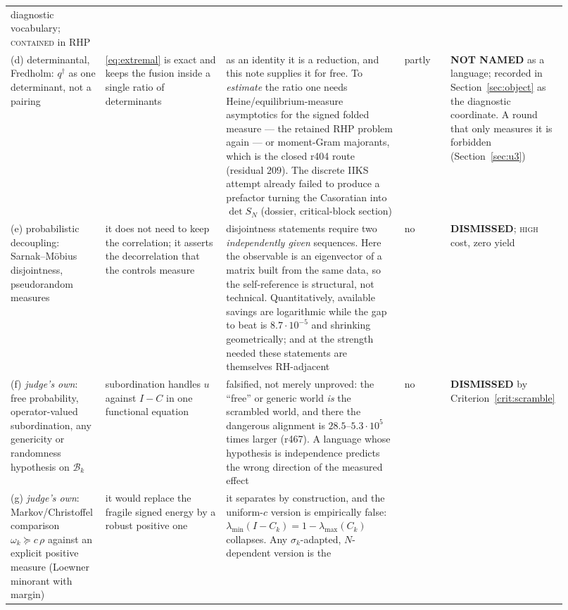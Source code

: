 \documentclass[11pt]{article}
\theoremstyle{remark}
\newcommand{\qdag}{q^{\dagger}}
\begin{document}
{\begin{longtable}{@{}p{0.155\linewidth}p{0.215\linewidth}p{0.315\linewidth}p{0.085\linewidth}p{0.145\linewidth}@{}}
{diagnostic vocabulary}; \textsc{contained} in RHP\\
\addlinespace
(d) determi\-nantal, Fredholm: $\qdag$ as one determinant, not a
pairing &
\eqref{eq:extremal} is exact and keeps the fusion inside a single
ratio of determinants &
as an identity it is a reduction, and this note supplies it for free.
To \emph{estimate} the ratio one needs Heine/equilibrium-measure
asymptotics for the signed folded measure --- the retained RHP
problem again --- or moment-Gram majorants, which is the closed r404
route (residual $209$).  The discrete IIKS attempt already failed to
produce a prefactor turning the Casoratian into $\det S_N$ (dossier,
critical-block section) &
partly &
\textbf{NOT NAMED} as a language; recorded in
Section~\ref{sec:object} as the diagnostic coordinate.  A round that
only measures it is forbidden (Section~\ref{sec:u3})\\
\addlinespace
(e) probabilistic decoupling: Sarnak--M\"obius disjointness,
pseudo\-random measures &
it does not need to keep the correlation; it asserts the
decorrelation that the controls measure &
disjointness statements require two \emph{independently given}
sequences.  Here the observable is an eigenvector of a matrix built
from the same data, so the self-reference is structural, not
technical.  Quantitatively, available savings are logarithmic while
the gap to beat is $8.7\cdot10^{-5}$ and shrinking geometrically;
and at the strength needed these statements are themselves
RH-adjacent &
no &
\textbf{DISMISSED}; \textsc{high} cost, zero yield\\
\addlinespace
(f) \emph{judge's own}: free probability, operator-valued
subordination, any genericity or randomness hypothesis on
$\mathcal B_k$ &
subordination handles $u$ against $I-C$ in one functional equation &
falsified, not merely unproved: the ``free'' or generic world
\emph{is} the scrambled world, and there the dangerous alignment is
$28.5$--$5.3\cdot10^{5}$ times larger (r467).  A language whose
hypothesis is independence predicts the wrong direction of the
measured effect &
no &
\textbf{DISMISSED} by Criterion~\ref{crit:scramble}\\
\addlinespace
(g) \emph{judge's own}: Markov/Chris\-toffel comparison
$\omega_k\succeq c\,\rho$ against an explicit positive
measure (Loewner minorant with margin) &
it would replace the fragile signed energy by a robust positive one &
it separates by construction, and the uniform-$c$ version is
empirically false: $\lambda_{\min}(I-C_k)=1-\lambda_{\max}(C_k)$
collapses.  Any $\sigma_k$-adapted, $N$-dependent version is the

\end{longtable}}
\end{document}
